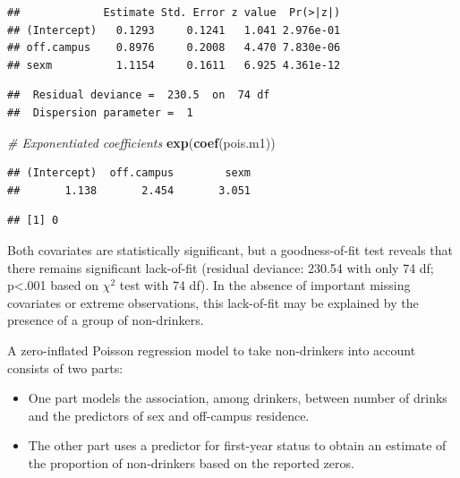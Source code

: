 \documentclass[
]{krantz}
\newenvironment{Shaded}{\begin{snugshade}}{\end{snugshade}}
\newcommand{\CommentTok}[1]{\textcolor[rgb]{0.37,0.37,0.37}{\textit{#1}}}
\newcommand{\DecValTok}[1]{\textcolor[rgb]{0.06,0.06,0.06}{#1}}
\newcommand{\KeywordTok}[1]{\textcolor[rgb]{0.27,0.27,0.27}{\textbf{#1}}}
\newcommand{\NormalTok}[1]{#1}
\newcommand{\OperatorTok}[1]{\textcolor[rgb]{0.43,0.43,0.43}{\textbf{#1}}}
\newcommand{\StringTok}[1]{\textcolor[rgb]{0.5,0.5,0.5}{#1}}
\providecommand{\tightlist}{%
  \setlength{\itemsep}{0pt}\setlength{\parskip}{0pt}}
\begin{document}
\begin{verbatim}
##             Estimate Std. Error z value  Pr(>|z|)
## (Intercept)   0.1293     0.1241   1.041 2.976e-01
## off.campus    0.8976     0.2008   4.470 7.830e-06
## sexm          1.1154     0.1611   6.925 4.361e-12
\end{verbatim}

\begin{verbatim}
##  Residual deviance =  230.5  on  74 df 
##  Dispersion parameter =  1
\end{verbatim}

\begin{Shaded}
\begin{Highlighting}[]
\CommentTok{# Exponentiated coefficients}
\KeywordTok{exp}\NormalTok{(}\KeywordTok{coef}\NormalTok{(pois.m1))}
\end{Highlighting}
\end{Shaded}

\begin{verbatim}
## (Intercept)  off.campus        sexm 
##       1.138       2.454       3.051
\end{verbatim}

\begin{Shaded}
\end{Shaded}

\begin{verbatim}
## [1] 0
\end{verbatim}

Both covariates are statistically significant, but a goodness-of-fit test reveals that there remains significant lack-of-fit (residual deviance: 230.54 with only 74 df; p\textless.001 based on \(\chi^2\) test with 74 df). In the absence of important missing covariates or extreme observations, this lack-of-fit may be explained by the presence of a group of non-drinkers.

A zero-inflated Poisson regression model to take non-drinkers into account consists of two parts:

\begin{itemize}
\tightlist
\item
  One part models the association, among drinkers, between number of drinks and the predictors of sex and off-campus residence.
\item
  The other part uses a predictor for first-year status to obtain an estimate of the proportion of non-drinkers based on the reported zeros.
\end{itemize}
\end{document}
